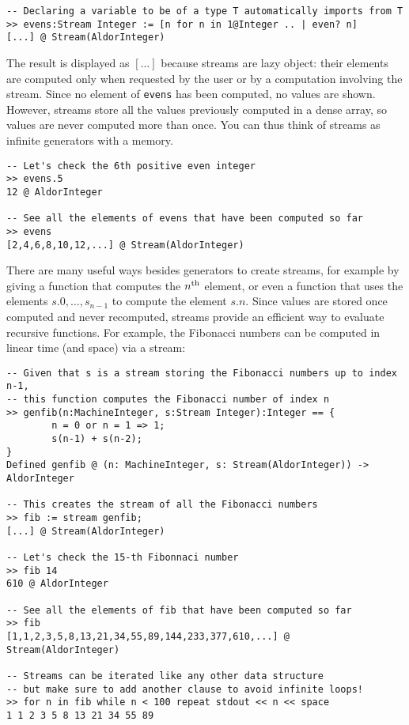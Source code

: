 \documentclass{article}
\newcommand{\sth}[1]{{#1}^{{\rm th}}}
\begin{document}
\begin{small}
\begin{verbatim}
-- Declaring a variable to be of a type T automatically imports from T
>> evens:Stream Integer := [n for n in 1@Integer .. | even? n]
[...] @ Stream(AldorInteger)
\end{verbatim}
\end{small}
The result is displayed as $[\dots]$ because streams
are lazy object: their elements are computed only when
requested by the user or by a computation involving the stream.
Since no element of {\tt evens} has been computed, no values
are shown. However, streams store all the values previously
computed in a dense array, so values are never computed more
than once. You can thus think of streams as infinite generators
with a memory.
\begin{small}
\begin{verbatim}
-- Let's check the 6th positive even integer
>> evens.5
12 @ AldorInteger

-- See all the elements of evens that have been computed so far
>> evens
[2,4,6,8,10,12,...] @ Stream(AldorInteger)
\end{verbatim}
\end{small}
There are many useful ways besides generators to create streams, for example
by giving a function that computes the $\sth{n}$ element,
or even a function that uses the elements $s.0,\dots,s_{n-1}$
to compute the element $s.n$. Since values are stored once
computed and never recomputed, streams provide an efficient way
to evaluate recursive functions. For example, the Fibonacci
numbers can be computed in linear time (and space) via a stream:
\begin{small}
\begin{verbatim}
-- Given that s is a stream storing the Fibonacci numbers up to index n-1,
-- this function computes the Fibonacci number of index n
>> genfib(n:MachineInteger, s:Stream Integer):Integer == {
        n = 0 or n = 1 => 1;
        s(n-1) + s(n-2);
}
Defined genfib @ (n: MachineInteger, s: Stream(AldorInteger)) -> AldorInteger

-- This creates the stream of all the Fibonacci numbers
>> fib := stream genfib;
[...] @ Stream(AldorInteger)

-- Let's check the 15-th Fibonnaci number
>> fib 14
610 @ AldorInteger

-- See all the elements of fib that have been computed so far
>> fib
[1,1,2,3,5,8,13,21,34,55,89,144,233,377,610,...] @ Stream(AldorInteger)

-- Streams can be iterated like any other data structure
-- but make sure to add another clause to avoid infinite loops!
>> for n in fib while n < 100 repeat stdout << n << space
1 1 2 3 5 8 13 21 34 55 89
\end{verbatim}
\end{small}
\end{document}
